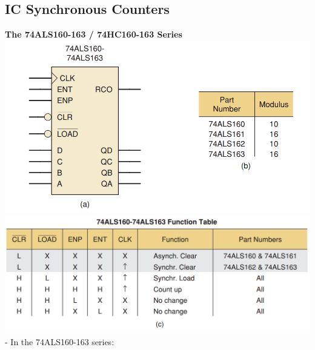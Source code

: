 \documentclass[12pt]{article}
\begin{document}
\subsection{IC Synchronous Counters}
\textbf{The 74ALS160-163 / 74HC160-163 Series} \\
\includegraphics[scale = 0.7]{hinh51}
\bigbreak
\includegraphics[scale = 0.7]{hinh52}
\bigbreak
- In the 74ALS160-163 series:
\end{document}
